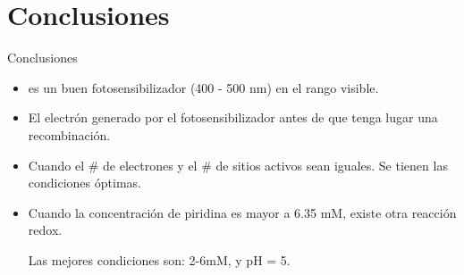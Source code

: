 \documentclass[handout]{beamer}
\begin{document}
\section{Conclusiones}
\begin{frame}{Conclusiones}
	\begin{itemize}
		\item {} es un buen fotosensibilizador (400 - 500 nm) en el rango visible.
		\item El electr\'on generado por el fotosensibilizador antes de que tenga lugar una recombinaci\'on.
		\item Cuando el \# de electrones y el \# de sitios activos sean iguales. Se tienen las condiciones \'optimas.
		\item Cuando la concentraci\'on de piridina es mayor a 6.35 mM, existe otra reacci\'on redox.
		\begin{block}{}
			Las mejores condiciones son: \ce{[Py]}2-6mM, y pH = 5.
		\end{block}
	\end{itemize}
\end{frame}
\end{document}
